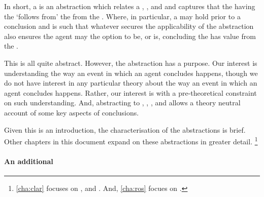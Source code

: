 \begin{note}
  In short, a \ros{} is an abstraction which relates a , , and  and captures that the \prop{} having the \val{} `follows from' the \pool{} from the \agpe{}.
  Where, in particular, a \ros{} may hold prior to a conclusion and is such that whatever secures the applicability of the abstraction also ensures the agent may the option to be, or is, concluding the  has value  from the .

  This is all quite abstract.
  However, the abstraction has a purpose.
  Our interest is understanding the way an event in which an agent concludes happens, though we do not have interest in any particular theory about the way an event in which an agent concludes happens.
  Rather, our interest is with a pre-theoretical constraint on such understanding.
  And, abstracting to , , , and  allows a theory neutral account of some key aspects of conclusions.

  Given this is an introduction, the characterisation of the abstractions is brief.
  Other chapters in this document expand on these abstractions in greater detail.%
  \footnote{
    \autoref{cha:clar} focuses on ,  and .
    And, \autoref{cha:ros} focues on .
  }
\end{note}



\paragraph*{An additional }


